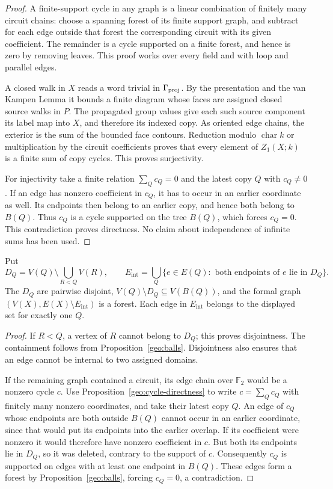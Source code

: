 \begin{proof}
A finite-support cycle in any graph is a linear combination of finitely
many circuit chains: choose a spanning forest of its finite support graph,
and subtract for each edge outside that forest the corresponding circuit
with its given coefficient.  The remainder is a cycle supported on a finite
forest, and hence is zero by removing leaves.  This proof works over every
field and with loop and parallel edges.

A closed walk in $X$ reads a word trivial in $\Gamma_{\mathrm{proj}}$.  By the presentation
and the van Kampen Lemma it bounds a finite diagram whose faces are assigned
closed source walks in $P$.  The propagated group values give each such
source component its label map into $X$, and therefore its indexed copy.
As oriented edge chains, the exterior is the sum of the bounded face
contours.  Reduction modulo $\operatorname{char} k$ or multiplication by
the circuit coefficients proves that every element of $Z_1(X;k)$ is a
finite sum of copy cycles.  This proves surjectivity.

For injectivity take a finite relation $\sum_Qc_Q=0$ and the latest copy
$Q$ with $c_Q\ne0$.  If an edge has nonzero coefficient in $c_Q$, it has
to occur in an earlier coordinate as well.  Its endpoints then belong
to an earlier copy, and hence both belong to $B(Q)$.  Thus $c_Q$ is a
cycle supported on the tree $B(Q)$, which forces $c_Q=0$.  This
contradiction proves directness.  No claim about independence of infinite
sums has been used.
\end{proof}

\begin{proposition}
\label{geo:forest}
Put
\[
 D_Q=V(Q)\setminus\bigcup_{R<Q}V(R),\qquad
 E_{\mathrm{int}}=\bigcup_Q
 \{e\in E(Q):\text{ both endpoints of }e\text{ lie in }D_Q\}.
\]
The $D_Q$ are pairwise disjoint,
$V(Q)\setminus D_Q\subseteq V(B(Q))$, and the formal graph
$(V(X),E(X)\setminus E_{\mathrm{int}})$ is a forest.  Each edge in
$E_{\mathrm{int}}$ belongs to the displayed set for exactly one $Q$.
\end{proposition}

\begin{proof}
If $R<Q$, a vertex of $R$ cannot belong to $D_Q$; this proves disjointness.
The containment follows from Proposition~\ref{geo:balls}.  Disjointness
also ensures that an edge cannot be internal to two assigned domains.

If the remaining graph contained a circuit, its edge chain over
$\mathbb F_2$ would be a nonzero cycle $c$.  Use
Proposition~\ref{geo:cycle-directness} to write $c=\sum_Qc_Q$ with
finitely many nonzero coordinates, and take their latest copy $Q$.
An edge of $c_Q$ whose endpoints are both outside $B(Q)$ cannot occur
in an earlier coordinate, since that would put its endpoints into the
earlier overlap.  If its coefficient were nonzero it would therefore
have nonzero coefficient in $c$.  But both its endpoints lie in $D_Q$,
so it was deleted, contrary to the support of $c$.  Consequently $c_Q$
is supported on edges with at least one endpoint in $B(Q)$.  These edges
form a forest by Proposition~\ref{geo:balls}, forcing $c_Q=0$, a
contradiction.
\end{proof}

